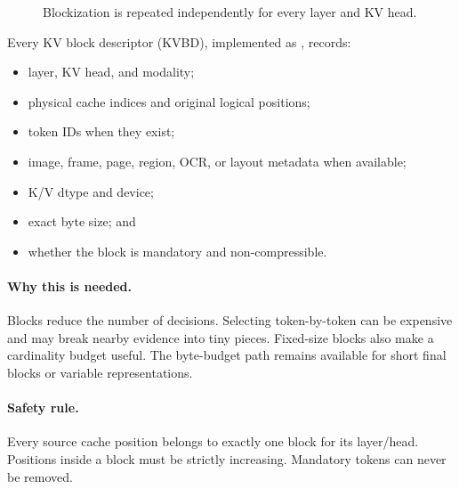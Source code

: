 \documentclass[11pt]{article}
\newcommand{\code}[1]{\texttt{\detokenize{#1}}}
\newcommand{\why}{\paragraph{Why this is needed.}}
\newcommand{\safety}{\paragraph{Safety rule.}}
\begin{document}
\begin{figure}[htbp]
\centering
{}
\caption{Blockization is repeated independently for every layer and KV head.}
\label{fig:blockization}
\end{figure}

Every KV block descriptor (KVBD), implemented as \code{KVBlockDescriptor}, records:

\begin{itemize}
  \item layer, KV head, and modality;
  \item physical cache indices and original logical positions;
  \item token IDs when they exist;
  \item image, frame, page, region, OCR, or layout metadata when available;
  \item K/V dtype and device;
  \item exact byte size; and
  \item whether the block is mandatory and non-compressible.
\end{itemize}

\why Blocks reduce the number of decisions. Selecting token-by-token can be expensive and may
break nearby evidence into tiny pieces. Fixed-size blocks also make a cardinality budget useful.
The byte-budget path remains available for short final blocks or variable representations.

\safety Every source cache position belongs to exactly one block for its layer/head. Positions
inside a block must be strictly increasing. Mandatory tokens can never be removed.
\end{document}
